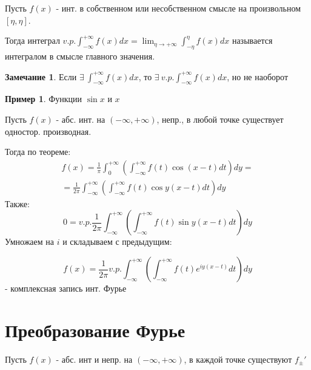 \documentclass{article}
\theoremstyle{definition}
\numberwithin{theorem}{section}
\numberwithin{lemma}{section}
\numberwithin{definition}{section}
\numberwithin{corollary}{section}
\newtheorem*{eg}{Пример}
\newtheorem*{remark}{Замечание}
\numberwithin{equation}{section}
\begin{document}
\begin{definition}
  Пусть $f(x)$ - инт. в собственном или несобственном смысле на произвольном $[\eta,\eta]$.

  Тогда интеграл $v.p.\int_{-\infty}^{+\infty}f(x)dx=\lim_{\eta \to +\infty}\int_{-\eta}^{\eta}f(x)dx$
  называется интегралом в смысле главного значения.
\end{definition}
\begin{remark}
  Если $\exists \ \int_{-\infty}^{+\infty}f(x)dx$, то $\exists \ v.p. \int_{-\infty}^{+\infty}f(x)dx$, но не наоборот
\end{remark}
\begin{eg}
  Функции $\sin x$ и $x$
\end{eg}
Пусть $f(x)$ - абс. инт. на $(-\infty,+\infty)$, непр., в любой точке существует одностор. производная.

Тогда по теореме:
\begin{gather*}
  f(x)=\frac{1}{\pi}\int_{0}^{+\infty}\left(\int_{-\infty}^{+\infty}f(t)\cos(x-t)dt\right)dy = \\ 
  = \frac{1}{2\pi}\int_{-\infty}^{+\infty}\left(\int_{-\infty}^{+\infty}f(t)\cos y (x-t)dt\right)dy
\end{gather*}
Также:
\[
  0=v.p.\frac{1}{2\pi}\int_{-\infty}^{+\infty}\left(\int_{-\infty}^{+\infty}f(t)\sin y(x-t)dt\right)dy
\]
Умножаем на $i$ и складываем с предыдущим:
\begin{definition}
\[
  f(x)=\frac{1}{2\pi}v.p. \int_{-\infty}^{+\infty}\left(\int_{-\infty}^{+\infty}f(t)e^{iy(x-t)}dt\right)dy \tag{0}
\]
- комплексная запись инт. Фурье
\end{definition}

\section{Преобразование Фурье}
Пусть $f(x)$ - абс. инт и непр. на $(-\infty,+\infty)$, в каждой точке существуют $f_{\pm}'$
\end{document}
